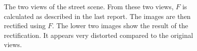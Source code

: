 \documentclass[11pt,a4paper]{article}
\begin{document}
\begin{figure}

\caption{The two views of the street scene. From these two views, $F$ is calculated as described in the last report. The images are then rectified using $F$. The lower two images show the result of the rectification. It appears very distorted compared to the original views.}%
\label{fig:2}
\end{figure}
\end{document}
